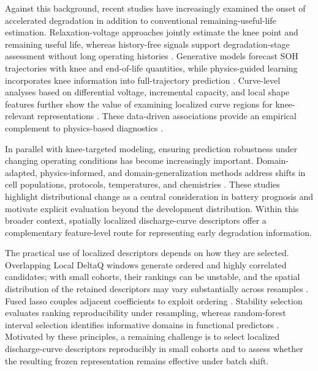 \documentclass[pdflatex,sn-mathphys-num]{sn-jnl}
\begin{document}
Against this background, recent studies have increasingly examined the onset of accelerated degradation in addition to conventional remaining-useful-life estimation. Relaxation-voltage approaches jointly estimate the knee point and remaining useful life, whereas history-free signals support degradation-stage assessment without long operating histories \cite{fan2024relaxation,zhao2024historyfree}. Generative models forecast SOH trajectories with knee and end-of-life quantities, while physics-guided learning incorporates knee information into full-trajectory prediction \cite{hu2025batterygpt,jia2024kneepoint}. Curve-level analyses based on differential voltage, incremental capacity, and local shape features further show the value of examining localized curve regions for knee-relevant representations \cite{fuhrmann2024dva,zheng2018icadva,wang2025ica,wang2024capacity,yu2025knee}. These data-driven associations provide an empirical complement to physics-based diagnostics \cite{birkl2017diagnostics,li2025degradationmodes}.

In parallel with knee-targeted modeling, ensuring prediction robustness under changing operating conditions has become increasingly important. Domain-adapted, physics-informed, and domain-generalization methods address shifts in cell populations, protocols, temperatures, and chemistries \cite{lu2023deepsoh,wang2024pinn,zhang2025batlinet,li2024varying,tan2024magnet}. These studies highlight distributional change as a central consideration in battery prognosis and motivate explicit evaluation beyond the development distribution. Within this broader context, spatially localized discharge-curve descriptors offer a complementary feature-level route for representing early degradation information.

The practical use of localized descriptors depends on how they are selected. Overlapping Local DeltaQ windows generate ordered and highly correlated candidates; with small cohorts, their rankings can be unstable, and the spatial distribution of the retained descriptors may vary substantially across resamples \cite{nogueira2018stability, kalousis2007stability}. Fused lasso couples adjacent coefficients to exploit ordering \cite{tibshirani2005fused}. Stability selection evaluates ranking reproducibility under resampling, whereas random-forest interval selection identifies informative domains in functional predictors \cite{meinshausen2010stability,servien2024interval}. Motivated by these principles, a remaining challenge is to select localized discharge-curve descriptors reproducibly in small cohorts and to assess whether the resulting frozen representation remains effective under batch shift.
\end{document}

